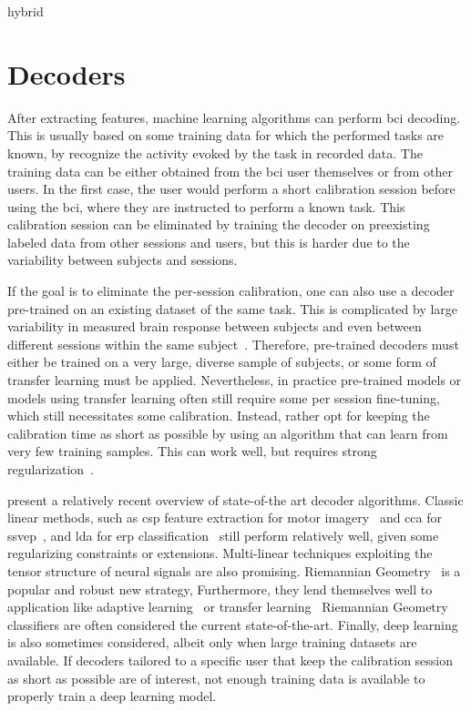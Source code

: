 hybrid

\section{Decoders}
\label{sec:bci-decoders}

After extracting features, machine learning algorithms can perform \ac{bci}
decoding.
This is usually based on
some training data for which the performed tasks are known, by recognize the
activity evoked by the task in recorded data.
The training data can be either obtained from the \ac{bci} user themselves or from
other users.
In the first case, the user would perform a short calibration session before
using the \ac{bci}, where they are instructed to perform a known task.
This calibration session can be eliminated by training the decoder on
preexisting labeled data from other sessions and users, but this is harder due
to the variability between subjects and sessions.


If the goal is to eliminate the per-session calibration, one can also use a
decoder pre-trained on an existing dataset of the same task.
This is complicated by large variability in measured brain response between subjects
and even between different sessions within the same
subject~\cite{Guger2009,Saha2020}.
Therefore, pre-trained decoders must either be trained on a very large, diverse
sample of subjects, or some form of transfer learning must be applied.
Nevertheless, in practice pre-trained models or models using transfer learning often still
require some per session fine-tuning, which still necessitates some
calibration.
Instead, rather opt for keeping the calibration time as short as possible by using
an algorithm that can learn from very few training samples.
This can work well, but requires strong regularization~\cite{VanDenKerchove2022}.

\textcite{Lotte2018, Xu2021} present a relatively recent overview of state-of-the art
decoder algorithms.
Classic linear methods, such as \ac{csp} feature extraction for
motor imagery~\cite{Park2017} and \ac{cca} for \ac{ssvep}~\cite{Nakanishi2017},
and \ac{lda} for \ac{erp} classification~\cite{Sosulski2022} still perform
relatively well, given some regularizing constraints or extensions.
Multi-linear techniques exploiting the tensor structure of neural signals are
also promising.
Riemannian Geometry~\cite{Barachant2014} is a popular and robust new strategy,
Furthermore, they lend themselves well to application like adaptive
learning~\cite{Benaroch2021} or transfer learning~\cite{Zanini2017}
Riemannian Geometry classifiers are often considered the current
state-of-the-art.
Finally, deep learning is also sometimes considered, albeit only when large
training datasets are available.
If decoders tailored to a specific user that keep the calibration session as
short as possible are of interest, not enough training data is available to
properly train a deep learning model.


